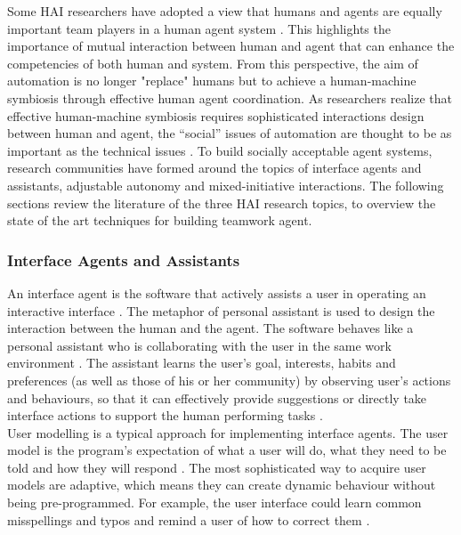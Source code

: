Some \ac{HAI} researchers have adopted a view that humans and agents are equally important team players in a human agent system \citep{Sukthankara}. This highlights the importance of mutual interaction between human and agent that can enhance the competencies of both human and system. From this perspective, the aim of automation is no longer "replace" humans but to achieve a human-machine symbiosis through effective human agent coordination. As researchers realize that effective human-machine symbiosis requires sophisticated interactions design between human and agent, the ``social'' issues of automation are thought to be as important as the technical issues \citep{Bradshaw2011}. To build socially acceptable agent systems, research communities have formed around the topics of interface agents and assistants, adjustable autonomy and mixed-initiative interactions. The following sections review the literature of the three \ac{HAI} research topics, to overview the state of the art techniques for building teamwork agent. 

\subsubsection{Interface Agents and Assistants}\label{sec:lrinterfaceagent}
An interface agent is the software that actively assists a user in operating an interactive interface \citep{Lieberman2003}. The metaphor of personal assistant is used to design the interaction between the human and the agent. The software behaves like a personal assistant who is collaborating with the user in the same work environment \citep{Lieberman1997}. The assistant learns the user's goal, interests, habits and preferences (as well as those of his or her community) by observing user's actions and behaviours,  so that it can effectively provide suggestions or directly take interface actions to support the human performing tasks \citep{Maes1994}.\\

User modelling is a typical approach for implementing interface agents. The user model is the program's expectation of what a user will do, what they need to be told and how they will respond \citep{Lieberman2003}.  The most sophisticated way to acquire user models are adaptive, which means they can create dynamic behaviour without being pre-programmed. For example, the user interface could learn common misspellings and typos and remind a user of how to correct them \citep{Lieberman2003}.\\

